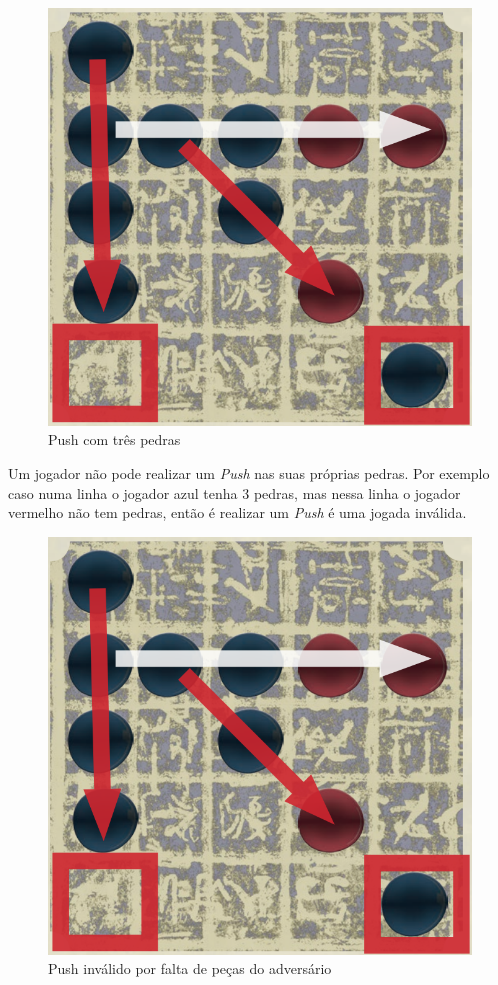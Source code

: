 \documentclass[a4paper]{article}
\begin{document}
\begin{figure}[!htb]
\centering
\includegraphics[scale=0.3]{push2.png} 
\caption{Push com três pedras}
\end{figure}

Um jogador não pode realizar um  \textit{Push} nas suas próprias pedras. Por exemplo caso numa linha o jogador azul tenha 3 pedras, mas nessa linha o jogador vermelho não tem pedras, então é realizar um  \textit{Push} é uma jogada inválida.

\begin{figure}[!htb]
\centering
\includegraphics[scale=0.3]{push2.png} 
\caption{Push inválido por falta de peças do adversário}
\end{figure}
\end{document}
